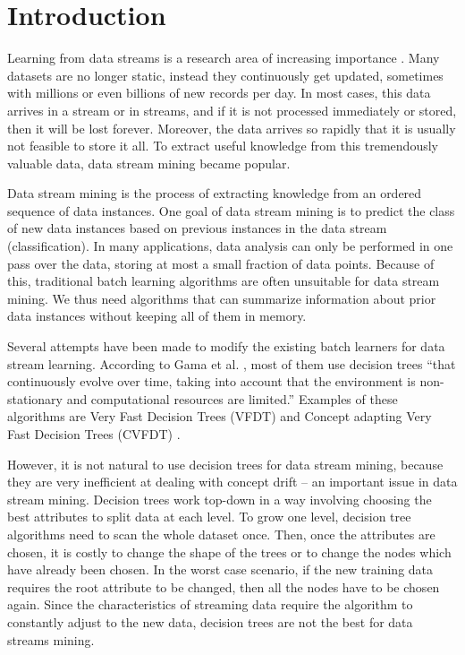 \documentclass[conference]{IEEEtran}
\begin{document}
		
		
		\section{Introduction}
		\label{sec:introduction}
		
		Learning from data streams is a research area of increasing importance \cite{evaluation_stream_mining}. Many datasets are no longer static, instead they continuously get updated, sometimes with millions or even billions of new records per day. In most cases, this data arrives in a stream or in streams, and if it is not processed immediately or stored, then it will be lost forever. Moreover, the data arrives so rapidly that it is usually not feasible to store it all. To extract useful knowledge from this tremendously valuable data, data stream mining became popular.
		
		Data stream mining is the process of extracting knowledge from an ordered sequence of data instances. One goal of data stream mining is to predict the class of new data instances based on previous instances in the data stream (classification). In many applications, data analysis can only be performed in one pass over the data, storing at most a small fraction of data points. Because of this, traditional batch learning algorithms are often unsuitable for data stream mining.  We thus need algorithms that can summarize information about prior data instances without keeping all of them in memory.  
		
		Several attempts have been made to modify the existing batch learners for data stream learning. According to Gama et al. \cite{evaluation_stream_mining}, most of them use decision trees ``that continuously evolve over time, taking into account that the environment is non-stationary and computational resources are limited.'' Examples of these algorithms are Very Fast Decision Trees (VFDT) \cite{VFDT} and Concept adapting Very Fast Decision Trees (CVFDT) \cite{CVFDT}.
		
		
		However, it is not natural to use decision trees for data stream mining, because they are very inefficient at dealing with concept drift -- an important issue in data stream mining. Decision trees work top-down in a way involving choosing the best attributes to split data at each level. To grow one level, decision tree algorithms need to scan the whole dataset once. Then, once the attributes are chosen, it is costly to change the shape of the trees or to change the nodes which have already been chosen. In the worst case scenario, if the new training data requires the root attribute to be changed, then all the nodes have to be chosen again. Since the characteristics of streaming data require the algorithm to constantly adjust to the new data, decision trees are not the best for data streams mining. 
		
\end{document}
